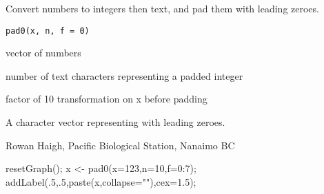 \documentclass[letterpaper]{book}
\begin{document}
\begin{Description}\relax
Convert numbers to integers then text, and pad them with leading zeroes.
\end{Description}
\begin{Usage}
\begin{verbatim}
pad0(x, n, f = 0)
\end{verbatim}
\end{Usage}
\begin{Arguments}
\begin{ldescription}
\item[\code{x}] vector of numbers
\item[\code{n}] number of text characters representing a padded integer
\item[\code{f}] factor of 10 transformation on x before padding
\end{ldescription}
\end{Arguments}
\begin{Value}
A character vector representing  with leading zeroes.
\end{Value}
\begin{Author}\relax
Rowan Haigh, Pacific Biological Station, Nanaimo BC
\end{Author}
\begin{Examples}
\begin{ExampleCode}
resetGraph(); x <- pad0(x=123,n=10,f=0:7);
addLabel(.5,.5,paste(x,collapse="\n"),cex=1.5);
\end{ExampleCode}
\end{Examples}
\end{document}

